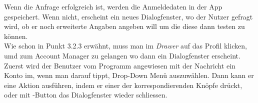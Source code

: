 \documentclass[a4paper,11pt]{article}
\begin{document}
Wenn die Anfrage erfolgreich ist, werden die Anmeldedaten in der App gespeichert. Wenn nicht, erscheint ein neues Dialogfenster, wo der Nutzer gefragt wird, ob er noch erweiterte Angaben angeben will um die diese dann testen zu können.\\

Wie schon in Punkt 3.2.3 erwähnt, muss man im \textit{Drawer} auf das Profil klicken, umd zum Account Manager zu gelangen wo dann ein Dialogfenster erscheint. Zuerst wird der Benutzer vom Programm angewiesen mit der Nachricht  ein Konto im, wenn man darauf tippt, Drop-Down Menü auszuwählen. Dann kann er eine Aktion ausführen, indem er einer der korrespondierenden Knöpfe drückt, oder mit -Button das Dialogfenster wieder schliessen.\\
\end{document}
